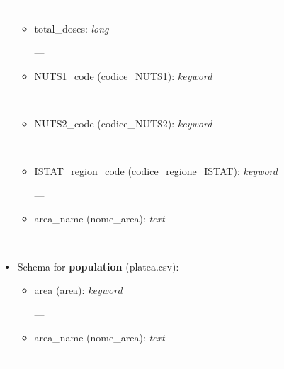 \documentclass[12pt, a4paper]{article}
\begin{document}
\begin{itemize}
\begin{itemize}
                \begin{footnotesize}
                    ---
                \end{footnotesize}
            \item total\_doses: \emph{long} \\
                \begin{footnotesize}
                    ---
                \end{footnotesize}
            \item NUTS1\_code (codice\_NUTS1): \emph{keyword} \\
                \begin{footnotesize}
                    ---
                \end{footnotesize}
            \item NUTS2\_code (codice\_NUTS2): \emph{keyword} \\
                \begin{footnotesize}
                    ---
                \end{footnotesize}
            \item ISTAT\_region\_code (codice\_regione\_ISTAT): \emph{keyword} \\
                \begin{footnotesize}
                    ---
                \end{footnotesize}
            \item area\_name (nome\_area): \emph{text} \\
                \begin{footnotesize}
                    ---
                \end{footnotesize}
        \end{itemize}
    \item Schema for \textbf{population} (platea.csv):
        \begin{itemize}
            \item area (area): \emph{keyword} \\
                \begin{footnotesize}
                    ---
                \end{footnotesize}
            \item area\_name (nome\_area): \emph{text} \\
                \begin{footnotesize}
                    ---
                \end{footnotesize}

\end{itemize}
\end{itemize}
\end{document}
